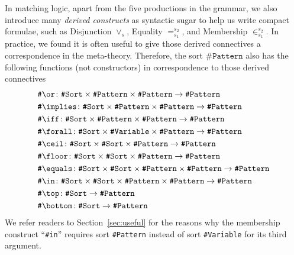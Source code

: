 \documentclass[UTF8,11pt]{article}
\theoremstyle{plain}
\theoremstyle{definition}
\theoremstyle{remark}
\newcommand{\sharpsymbol}{\#}
\newcommand{\KSort}{\texttt{\sharpsymbol Sort}}
\newcommand{\KVariable}{\texttt{\sharpsymbol Variable}}
\newcommand{\KPattern}{\texttt{\sharpsymbol Pattern}}
\newcommand{\Kor}{\texttt{\sharpsymbol \slashsymbol  or}}
\newcommand{\Kimplies}{\texttt{\sharpsymbol  \slashsymbol implies}}
\newcommand{\Kiff}{\texttt{\sharpsymbol  \slashsymbol iff}}
\newcommand{\Kforall}{\texttt{\sharpsymbol \slashsymbol  forall}}
\newcommand{\Kequals}{\texttt{\sharpsymbol \slashsymbol  equals}}
\newcommand{\Kmembership}{\Kin}
\newcommand{\Kin}{\texttt{\sharpsymbol \slashsymbol  in}}
\newcommand{\Ktop}{\texttt{\sharpsymbol \slashsymbol  top}}
\newcommand{\Kbottom}{\texttt{\sharpsymbol \slashsymbol  bottom}}
\newcommand{\Kfloor}{\texttt{\sharpsymbol \slashsymbol  floor}}
\newcommand{\Kceil}{\texttt{\sharpsymbol \slashsymbol  ceil}}
\newcommand{\slashsymbol}{\symbol{92}}
\begin{document}
In matching logic, apart from the five productions in the grammar, we also 
introduce many \emph{derived constructs} as syntactic sugar to help 
us write compact formulae, such as Disjunction $\vee_s$, Equality 
$=_{s_1}^{s_2}$, and Membership $\in_{s_1}^{s_2}$.
In practice, we found it is often useful to give those derived connectives a 
correspondence in the meta-theory. Therefore, the sort $\KPattern$ also has
the following functions (not constructors) in correspondence to those derived 
connectives
\begin{align*}
  & \Kor \colon \KSort\times\KPattern \times \KPattern   \to \KPattern
  \\
  & \Kimplies \colon \KSort\times\KPattern \times \KPattern   \to \KPattern
  \\
  & \Kiff \colon \KSort\times\KPattern \times \KPattern   \to \KPattern
  \\
  & \Kforall \colon \KSort\times\KVariable \times \KPattern   \to \KPattern
  \\
  & \Kceil \colon \KSort\times\KSort\times\KPattern     \to \KPattern
  \\
  & \Kfloor \colon \KSort\times\KSort\times\KPattern     \to \KPattern
  \\
  & \Kequals \colon \KSort\times\KSort \times \KPattern \times \KPattern \to 
  \KPattern
  \\
  & \Kmembership \colon \KSort \times \KSort \times \KPattern \times 
  \KPattern  \to \KPattern
  \\
  & \Ktop \colon \KSort \to \KPattern
  \\
  & \Kbottom \colon \KSort \to \KPattern
\end{align*}
We refer readers to Section~\ref{sec:useful} for the reasons why the membership construct ``\Kin'' requires sort {\KPattern} instead of sort {\KVariable} for its third argument.
\end{document}
